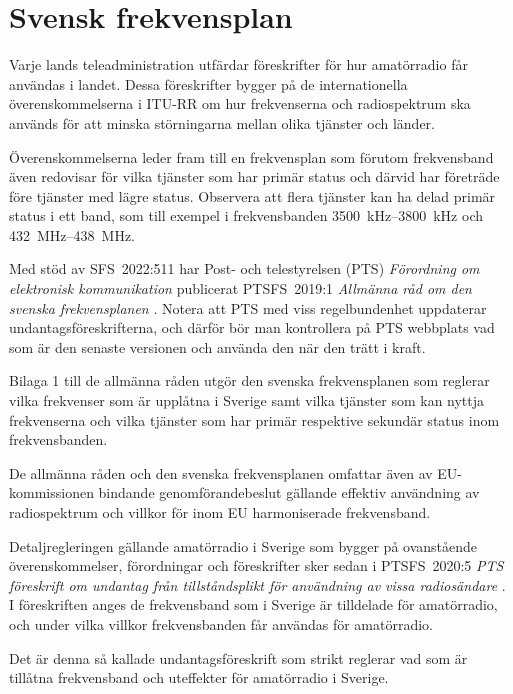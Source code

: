 \chapter{Svensk frekvensplan}
\label{svensk frekvensplan}

Varje lands teleadministration utfärdar föreskrifter för hur amatörradio får
användas i landet.
Dessa föreskrifter bygger på de internationella överenskommelserna i ITU-RR
\cite[ARTICLE 5]{ITU-RR} om hur frekvenserna och radiospektrum ska används för
att minska störningarna mellan olika tjänster och länder.

Överenskommelserna leder fram till en frekvensplan som förutom frekvensband även
redovisar för vilka tjänster som har primär status och därvid har företräde före
tjänster med lägre status.
Observera att flera tjänster kan ha delad primär status i ett band, som till
exempel i frekvensbanden \SIrange{3500}{3800}{\kilo\hertz} och
\SIrange{432}{438}{\mega\hertz}.

Med stöd av SFS~2022:511 har Post- och telestyrelsen (PTS)
\emph{Förordning om elektronisk kommunikation} \cite{SFS2022:511}
publicerat PTSFS~2019:1 \emph{Allmänna råd om den svenska frekvensplanen}
\cite{PTSFS2019:1}.
Notera att PTS med viss regelbundenhet uppdaterar undantagsföreskrifterna,
och därför bör man kontrollera på PTS webbplats vad som är den senaste versionen
och använda den när den trätt i kraft.

Bilaga 1 till de allmänna råden utgör den svenska frekvensplanen som reglerar
vilka frekvenser som är upplåtna i Sverige samt vilka tjänster som kan nyttja
frekvenserna och vilka tjänster som har primär respektive sekundär status inom
frekvensbanden.

\newpage

De allmänna råden och den svenska frekvensplanen omfattar även av
EU-kommissionen bindande genomförandebeslut gällande effektiv användning av
radiospektrum och villkor för inom EU harmoniserade frekvensband.

Detaljregleringen gällande amatörradio i Sverige som bygger på ovanstående
överenskommelser, förordningar och föreskrifter sker sedan i PTSFS~2020:5
\emph{PTS föreskrift om undantag från tillståndsplikt för användning av vissa
  radiosändare} \cite{PTSFS2022:19}.
I föreskriften anges de frekvensband som i Sverige är tilldelade för
amatörradio, och under vilka villkor frekvensbanden får användas för
amatörradio.

Det är denna så kallade undantagsföreskrift som strikt reglerar vad som är
tillåtna frekvensband och uteffekter för amatörradio i Sverige.

